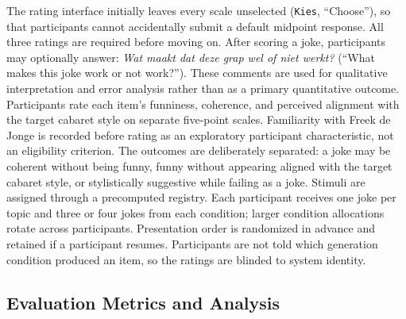\documentclass[11pt]{article}
\begin{document}
The rating interface initially leaves every scale unselected (\texttt{Kies}, ``Choose''), so that participants cannot accidentally submit a default midpoint response. All three ratings are required before moving on. After scoring a joke, participants may optionally answer: \emph{Wat maakt dat deze grap wel of niet werkt?} (``What makes this joke work or not work?''). These comments are used for qualitative interpretation and error analysis rather than as a primary quantitative outcome. Participants rate each item's funniness, coherence, and perceived alignment with the target cabaret style on separate five-point scales. Familiarity with Freek de Jonge is recorded before rating as an exploratory participant characteristic, not an eligibility criterion. The outcomes are deliberately separated: a joke may be coherent without being funny, funny without appearing aligned with the target cabaret style, or stylistically suggestive while failing as a joke. Stimuli are assigned through a precomputed registry. Each participant receives one joke per topic and three or four jokes from each condition; larger condition allocations rotate across participants. Presentation order is randomized in advance and retained if a participant resumes. Participants are not told which generation condition produced an item, so the ratings are blinded to system identity.

\subsection{Evaluation Metrics and Analysis}\label{evaluation-metrics-and-analysis}
\end{document}
